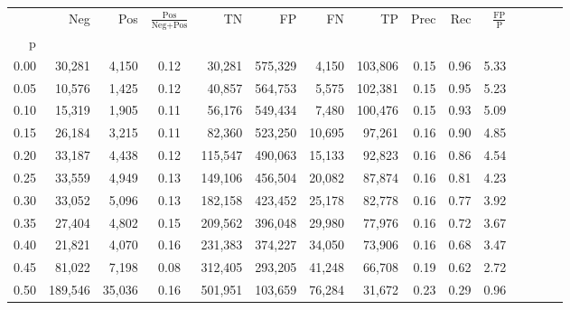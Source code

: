 \begin{tabular}{rrrcrrrrrrrrrrr}
\toprule
{} &      Neg &     Pos & $\frac{\text{Pos}}{\text{Neg}+\text{Pos}}$ &       TN &       FP &       FN &       TP &  Prec &   Rec & $\frac{\text{FP}}{\text{P}}$ \\
p    &          &         &                                            &          &          &          &          &       &       &                              \\
\midrule
0.00 &   30,281 &   4,150 &                                       0.12 &   30,281 &  575,329 &    4,150 &  103,806 &  0.15 &  0.96 &                         5.33 \\
0.05 &   10,576 &   1,425 &                                       0.12 &   40,857 &  564,753 &    5,575 &  102,381 &  0.15 &  0.95 &                         5.23 \\
0.10 &   15,319 &   1,905 &                                       0.11 &   56,176 &  549,434 &    7,480 &  100,476 &  0.15 &  0.93 &                         5.09 \\
0.15 &   26,184 &   3,215 &                                       0.11 &   82,360 &  523,250 &   10,695 &   97,261 &  0.16 &  0.90 &                         4.85 \\
0.20 &   33,187 &   4,438 &                                       0.12 &  115,547 &  490,063 &   15,133 &   92,823 &  0.16 &  0.86 &                         4.54 \\
0.25 &   33,559 &   4,949 &                                       0.13 &  149,106 &  456,504 &   20,082 &   87,874 &  0.16 &  0.81 &                         4.23 \\
0.30 &   33,052 &   5,096 &                                       0.13 &  182,158 &  423,452 &   25,178 &   82,778 &  0.16 &  0.77 &                         3.92 \\
0.35 &   27,404 &   4,802 &                                       0.15 &  209,562 &  396,048 &   29,980 &   77,976 &  0.16 &  0.72 &                         3.67 \\
0.40 &   21,821 &   4,070 &                                       0.16 &  231,383 &  374,227 &   34,050 &   73,906 &  0.16 &  0.68 &                         3.47 \\
0.45 &   81,022 &   7,198 &                                       0.08 &  312,405 &  293,205 &   41,248 &   66,708 &  0.19 &  0.62 &                         2.72 \\
0.50 &  189,546 &  35,036 &                                       0.16 &  501,951 &  103,659 &   76,284 &   31,672 &  0.23 &  0.29 &                         0.96 \\

\end{tabular}
